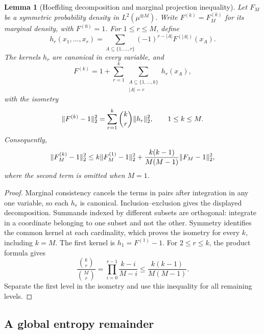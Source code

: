 \documentclass[11pt,reqno]{amsart}
\numberwithin{equation}{section}
\theoremstyle{plain}
\newtheorem{lemma}[lemma]{Lemma}
\theoremstyle{definition}
\DeclarePairedDelimiter{\norm}{\lVert}{\rVert}
\begin{document}
\begin{lemma}[Hoeffding decomposition and marginal projection inequality]
\label{lem:local-Hoeffding}
Let $F_M$ be a symmetric probability density in $L^2(\mu^{\otimes M})$. Write $F^{(k)}=F_M^{(k)}$ for its marginal density, with $F^{(0)}=1$. For $1\leq r\leq M$, define
\begin{equation}
 h_r(x_1,\ldots,x_r)
 =\sum_{A\subseteq\{1,\ldots,r\}}(-1)^{r-|A|}F^{(|A|)}(x_A).
 \label{eq:local-Hoeffding-projection}
\end{equation}
The kernels $h_r$ are canonical in every variable, and
\begin{equation}
 F^{(k)}=1+\sum_{r=1}^k\sum_{\substack{A\subseteq\{1,\ldots,k\}\\|A|=r}}h_r(x_A),
 \label{eq:prescribed-growing-Hoeffding-expansion}
\end{equation}
with the isometry
\begin{equation}
 \norm{F^{(k)}-1}_2^2=\sum_{r=1}^k\binom kr\norm{h_r}_2^2,
 \qquad 1\leq k\leq M.
 \label{eq:local-Hoeffding-orthogonality}
\end{equation}
Consequently,
\begin{equation}
 \norm{F_M^{(k)}-1}_2^2
 \leq k\norm{F_M^{(1)}-1}_2^2
 +\frac{k(k-1)}{M(M-1)}\norm{F_M-1}_2^2,
 \label{eq:local-Hoeffding-inequality}
\end{equation}
where the second term is omitted when $M=1$.
\end{lemma}
\begin{proof}
Marginal consistency cancels the terms in pairs after integration in any one variable, so each $h_r$ is canonical. Inclusion--exclusion gives the displayed decomposition. Summands indexed by different subsets are orthogonal: integrate in a coordinate belonging to one subset and not the other. Symmetry identifies the common kernel at each cardinality, which proves the isometry for every $k$, including $k=M$. The first kernel is $h_1=F^{(1)}-1$. For $2\leq r\leq k$, the product formula gives
\begin{equation}
 \frac{\binom kr}{\binom Mr}
 =\prod_{i=0}^{r-1}\frac{k-i}{M-i}
 \leq\frac{k(k-1)}{M(M-1)}.
 \label{eq:local-Hoeffding-binomial-ratio}
\end{equation}
Separate the first level in the isometry and use this inequality for all remaining levels.
\end{proof}

\subsection{A global entropy remainder}
\label{subsec:shared-entropy-remainder}
\end{document}
